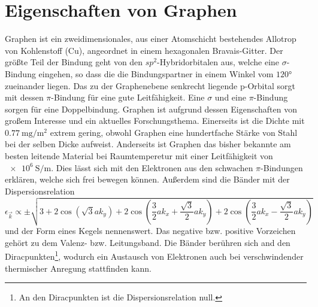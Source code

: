 \section{Eigenschaften von Graphen}
Graphen ist ein zweidimensionales, aus einer Atomschicht bestehendes Allotrop von Kohlenstoff (Cu), angeordnet in einem hexagonalen
Bravais-Gitter. 
Der größte Teil der Bindung geht von den $sp^2$-Hybridorbitalen aus, welche eine $\sigma$-Bindung eingehen, so dass 
die die Bindungspartner in einem Winkel vom $\ang{120;;}$ zueinander liegen. 
Das zu der Graphenebene senkrecht liegende p-Orbital sorgt mit dessen $\pi$-Bindung für eine gute Leitfähigkeit.\cite{graphene_properties}
Eine $\sigma$ und eine $\pi$-Bindung sorgen für eine Doppelbindung.
Graphen ist aufgrund dessen Eigenschaften von großem Interesse und ein aktuelles Forschungsthema.
Einerseits ist die  Dichte mit $\qty{0.77}{\milli\gram\per\metre\squared}$ extrem gering, obwohl 
Graphen eine hundertfache Stärke von Stahl bei der selben Dicke aufweist.\cite{graphene_properties} 
Anderseits ist Graphen das bisher bekannte am besten leitende Material bei Raumtemperetur mit einer Leitfähigkeit von 
$\qty{e6}{\siemens\per\metre}$\cite{graphene_properties}. 
Dies lässt sich mit den Elektronen aus den schwachen $\pi$-Bindungen erklären, welche sich frei bewegen können.
Außerdem sind die Bänder mit der Dispersionsrelation
\begin{equation*}
    \epsilon_{\vec{k}} \propto \pm \sqrt{3+2\cos(\sqrt{3}ak_y)+2\cos(\frac{3}{2}ak_x+\frac{\sqrt{3}}{2}ak_y) + 2\cos(\frac{3}{2}ak_x-\frac{\sqrt{3}}{2}ak_y) }
\end{equation*}
und der Form eines Kegels nennenswert.
Das negative bzw. positive Vorzeichen gehört zu dem Valenz- bzw. Leitungsband. 
Die Bänder berühren sich and den Diracpunkten\footnote{An den Diracpunkten ist die Dispersionsrelation null.}, wodurch ein Austausch von Elektronen auch bei verschwindender thermischer Anregung 
stattfinden kann.\cite{graphene_properties}
